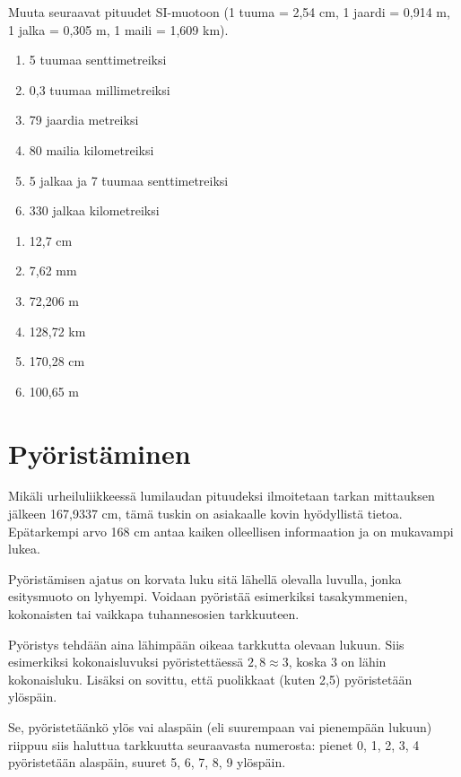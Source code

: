 \begin{tehtava}
Muuta seuraavat pituudet SI-muotoon (1 tuuma = 2,54 cm, 1 jaardi = 0,914 m, 1 jalka = 0,305 m, 1 maili = 1,609 km).
\begin{enumerate}
\item 5 tuumaa senttimetreiksi
\item 0,3 tuumaa millimetreiksi
\item 79 jaardia metreiksi
\item 80 mailia kilometreiksi
\item 5 jalkaa ja 7 tuumaa senttimetreiksi
\item 330 jalkaa kilometreiksi 
\end{enumerate}
\begin{vastaus}
\begin{enumerate}
\item 12,7 cm
\item 7,62 mm
\item 72,206 m
\item 128,72 km
\item 170,28 cm
\item 100,65 m
\end{enumerate}
\end{vastaus}
\end{tehtava}

\section*{Pyöristäminen}

Mikäli urheiluliikkeessä lumilaudan pituudeksi ilmoitetaan tarkan mittauksen jälkeen 167,9337 cm, tämä tuskin on asiakaalle kovin hyödyllistä tietoa. Epätarkempi arvo 168 cm antaa kaiken olleellisen informaation ja on mukavampi lukea.

Pyöristämisen ajatus on korvata luku sitä lähellä olevalla luvulla, jonka esitysmuoto on lyhyempi. Voidaan pyöristää
esimerkiksi tasakymmenien, kokonaisten tai vaikkapa tuhannesosien
tarkkuuteen.

Pyöristys tehdään aina lähimpään oikeaa tarkkutta olevaan lukuun. Siis esimerkiksi kokonaisluvuksi pyöristettäessä $2,8 \approx 3$, koska 3 on lähin kokonaisluku. Lisäksi on sovittu, että
puolikkaat (kuten 2,5) pyöristetään ylöspäin.

Se, pyöristetäänkö ylös vai alaspäin (eli suurempaan vai
pienempään lukuun) riippuu siis haluttua tarkkuutta
seuraavasta numerosta: pienet
0, 1, 2, 3, 4 pyöristetään alaspäin, suuret 5, 6, 7, 8, 9 ylöspäin.

